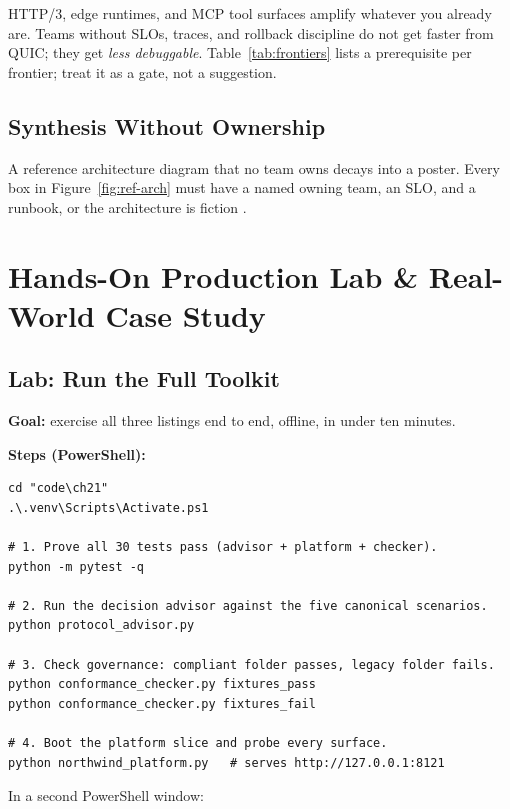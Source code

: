 HTTP/3, edge runtimes, and MCP tool surfaces amplify whatever you already
are. Teams without SLOs, traces, and rollback discipline do not get faster
from QUIC; they get \emph{less debuggable}. Table~\ref{tab:frontiers} lists a
prerequisite per frontier; treat it as a gate, not a suggestion.

\subsection{Synthesis Without Ownership}

A reference architecture diagram that no team owns decays into a poster.
Every box in Figure~\ref{fig:ref-arch} must have a named owning team, an SLO,
and a runbook, or the architecture is fiction
\cite{newman2021microservices}.

\section{Hands-On Production Lab \& Real-World Case Study}

\subsection{Lab: Run the Full Toolkit}

\textbf{Goal:} exercise all three listings end to end, offline, in under ten
minutes.

\textbf{Steps (PowerShell):}

\begin{verbatim}
cd "code\ch21"
.\.venv\Scripts\Activate.ps1

# 1. Prove all 30 tests pass (advisor + platform + checker).
python -m pytest -q

# 2. Run the decision advisor against the five canonical scenarios.
python protocol_advisor.py

# 3. Check governance: compliant folder passes, legacy folder fails.
python conformance_checker.py fixtures_pass
python conformance_checker.py fixtures_fail

# 4. Boot the platform slice and probe every surface.
python northwind_platform.py   # serves http://127.0.0.1:8121
\end{verbatim}

In a second PowerShell window:

